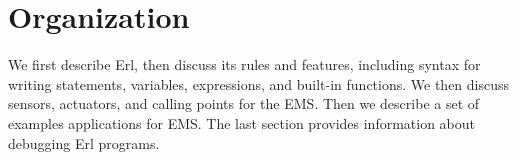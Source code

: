 \section{Organization}\label{organization}

We first describe Erl, then discuss its rules and features, including syntax for writing statements, variables, expressions, and built-in functions. We then discuss sensors, actuators, and calling points for the EMS. Then we describe a set of examples applications for EMS. The last section provides information about debugging Erl programs.
